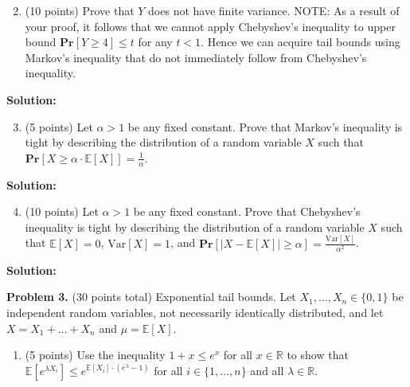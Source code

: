 \documentclass[11pt]{article}
\newcommand{\Ex}[1]{\ensuremath{\mathbb{E}\left[#1\right]}}
\newcommand{\Var}[1]{\ensuremath{\text{Var}\left[#1\right]}}
\newcommand{\PPr}[1]{\ensuremath{\mathbf{Pr}\left[#1\right]}}
\begin{document}
\begin{enumerate}
\setcounter{enumi}{1}
\item (10 points)
Prove that $Y$ does not have finite variance. 
\vskip 0.1in\noindent
NOTE: As a result of your proof, it follows that we cannot apply Chebyshev's inequality to upper bound $\PPr{Y\ge 4}\le t$ for any $t<1$. Hence we can acquire tail bounds using Markov's inequality that do not immediately follow from Chebyshev's inequality.
\end{enumerate}

\noindent\textbf{Solution:}




\begin{enumerate}
\setcounter{enumi}{2}
\item (5 points)
Let $\alpha>1$ be any fixed constant. 
Prove that Markov's inequality is tight by describing the distribution of a random variable $X$ such that $\PPr{X\ge\alpha\cdot\Ex{X}}=\frac{1}{\alpha}$. 
\end{enumerate}

\noindent\textbf{Solution:}





\begin{enumerate}
\setcounter{enumi}{3}
\item (10 points)
Let $\alpha>1$ be any fixed constant. 
Prove that Chebyshev's inequality is tight by describing the distribution of a random variable $X$ such that $\Ex{X}=0$, $\Var{X}=1$, and $\PPr{|X-\Ex{X}|\ge\alpha}=\frac{\Var{X}}{\alpha^2}$. 
\end{enumerate}

\noindent\textbf{Solution:}










\newpage\noindent
\textbf{Problem 3.} (30 points total)
Exponential tail bounds.
\vskip 0.1in\noindent
Let $X_1,\ldots,X_n\in\{0,1\}$ be independent random variables, not necessarily identically distributed, and let $X=X_1+\ldots+X_n$ and $\mu=\Ex{X}$. 
\begin{enumerate}
\item (5 points)
Use the inequality $1+x\le e^x$ for all $x\in\mathbb{R}$ to show that $\Ex{e^{\lambda X_i}}\le e^{\Ex{X_i}\cdot(e^\lambda-1)}$ for all $i\in\{1,\ldots,n\}$ and all $\lambda\in\mathbb{R}$. 
\end{enumerate}
\end{document}

